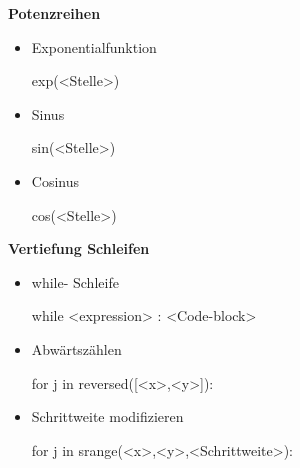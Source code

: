 \documentclass[a4paper,9pt,DIV15,twocolumn]{scrartcl}
\begin{document}
\textbf{Potenzreihen}

\begin{itemize}
 \item Exponentialfunktion
\begin{sagein}
 exp(<Stelle>)
\end{sagein}
\item Sinus
\begin{sagein}
 sin(<Stelle>)
\end{sagein}
\item Cosinus
\begin{sagein}
 cos(<Stelle>)
\end{sagein}
\end{itemize}

\textbf{Vertiefung Schleifen}

\begin{itemize}
 \item while- Schleife
\begin{sagein}
while <expression> :
    <Code-block>
\end{sagein}
\item Abwärtszählen
\begin{sagein}
for j in reversed([<x>,<y>]):
\end{sagein}
\item Schrittweite modifizieren
\begin{sagein}
for j in srange(<x>,<y>,<Schrittweite>): 
\end{sagein}
\end{itemize}
\end{document}
